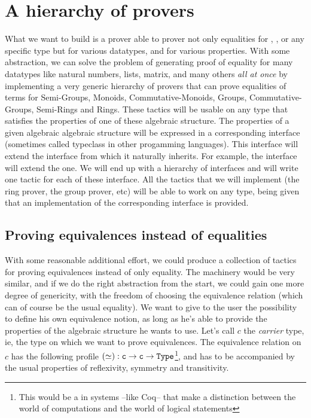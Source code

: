 \section{A hierarchy of provers}

What we want to build is a prover able to prover not only equalities for , , or any specific type but for various datatypes, and for various properties. With some abstraction, we can solve the problem of generating proof of equality for many datatypes like natural numbers, lists, matrix, and many others \emph{all at once} by implementing a very generic hierarchy of provers that can prove equalities of terms for Semi-Groups, Monoids, Commutative-Monoids, Groups, Commutative-Groups, Semi-Rings and Rings. These tactics will be usable on any type that satisfies the properties of one of these algebraic structure. The properties of a given algebraic algebraic structure will be expressed in a corresponding interface (sometimes called typeclass in other progamming languages). This interface will extend the interface from which it naturally inherits. For example, the  interface will extend the  one. We will end up with a hierarchy of interfaces and will write one tactic for each of these interface. All the tactics that we will implement (the ring prover, the group prover, etc) will be able to work on any type, being given that an implementation of the corresponding interface is provided.

	\subsection{Proving equivalences instead of equalities}
	
With some reasonable additional effort, we could produce a collection of tactics for proving equivalences instead of only equality. The machinery would be very similar, and if we do the right abstraction from the start, we could gain one more degree of genericity, with the freedom of choosing the equivalence relation (which can of course be the usual equality). We want to give to the user the possibility to define his own equivalence notion, as long as he's able to provide the properties of the algebraic structure he wants to use. Let's call $c$ the \emph{carrier} type, ie, the type on which we want to prove equivalences. The equivalence relation on $c$ has the following profile $(\simeq) : {\mbox{\texttt{c}}} \rightarrow {\mbox{\texttt{c}}} \rightarrow {\mbox{\texttt{Type}}}$\footnote{This  would be a  in systems --like Coq-- that make a distinction between the world of computations and the world of logical statements}, and has to be accompanied by the usual properties of reflexivity, symmetry and transitivity.

